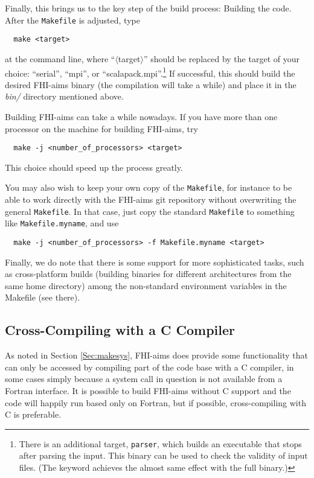 Finally, this brings us to the key step of the build process: Building the
code. After the \texttt{Makefile} is adjusted, type

\begin{verbatim}
  make <target>
\end{verbatim}

at the command line, where ``$\langle$target$\rangle$'' should be replaced by
the target of your choice: 
``serial'', ``mpi'', or ``scalapack.mpi''.\footnote{There is an
  additional target, \texttt{parser}, which builds an executable 
that stops after parsing the input. This binary can be used to check the
validity of input files. (The  keyword achieves the
almost same effect with the full binary.)
} 
If successful, this should build
the desired FHI-aims binary (the compilation will take a while) and place it
in the \emph{bin/} directory mentioned above.

Building FHI-aims can take a while nowadays. If you have more than one
processor on the machine for building FHI-aims, try

\begin{verbatim}
  make -j <number_of_processors> <target>
\end{verbatim}

This choice should speed up the process greatly.

You may also wish to keep your own copy of the \texttt{Makefile}, for
instance to be able to work directly with the FHI-aims git repository
without overwriting the general \texttt{Makefile}. In that case, just
copy the standard \texttt{Makefile} to something like
\texttt{Makefile.myname}, and use 

\begin{verbatim}
  make -j <number_of_processors> -f Makefile.myname <target>
\end{verbatim}

Finally, we do note that there is some support for more sophisticated
tasks, such as cross-platform builds (building binaries for different
architectures from the same home directory) among the non-standard
environment variables in the Makefile (see there). 

\subsection{Cross-Compiling with a C Compiler}
\label{cross-compile-c}

As noted in Section \ref{Sec:makesys}, FHI-aims does provide some
functionality that can only be accessed by compiling part of the code
base with a C compiler, in some cases simply because a system call in
question is not available from a Fortran interface. It is possible to
build FHI-aims without C support and the code will happily run based
only on Fortran, but if possible, cross-compiling with C is preferable. 

